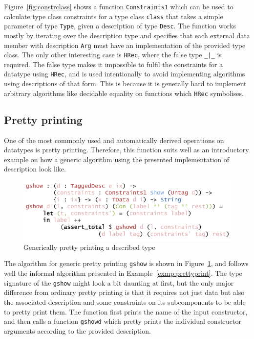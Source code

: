 \documentclass{ituthesis}
\newcommand{\ttconstructor}[1]{\textcolor{constructor-color}{\texttt{#1}}}
\newcommand{\tttype}[1]{\textcolor{type-color}{\texttt{#1}}}
\newcommand{\ttdec}[1]{\textcolor{declared-var-color}{\texttt{#1}}}
\newcommand{\ttvar}[1]{\textcolor{local-var-color}{\texttt{#1}}}
\theoremstyle{break}
\begin{document}
Figure~\ref{fig:constrclass} shows a function \ttdec{Constraints1} which can be used to calculate type class constraints
for a type class \ttvar{class} that takes a simple parameter of type \tttype{Type}, given a description of type \tttype{Desc}.
The function works mostly by iterating over the description type and specifies that each external data member with description \ttconstructor{Arg}
must have an implementation of the provided type class.
The only other interesting case is \ttconstructor{HRec}, where the false type \tttype{\_|\_} is required.
The false type makes it impossible to fulfil the constraints for a datatype using \ttconstructor{HRec}, and is used intentionally to avoid implementing algorithms using descriptions of that form.
This is because it is generally hard to implement arbitrary algorithms like decidable equality on functions which \ttconstructor{HRec} symbolises.

\subsection{Pretty printing}
\label{sub:Pretty printing}
One of the most commonly used and automatically derived operations on datatypes is pretty printing.
Therefore, this function suits well as an introductory example on how a generic algorithm using the presented implementation of description
look like.

\begin{figure}[ht]
\begin{center}
    \includegraphics[scale=0.5]{Figures/GenericShow.png}
\end{center}
\caption{Generically pretty printing a described type}
\label{fig:showgen}
\end{figure}

The algorithm for generic pretty printing \ttdec{gshow} is shown in Figure~\ref{fig:showgen}, and follows well the informal algorithm presented in Example~\ref{exmp:prettyprint}.
The type signature of the \ttdec{gshow} might look a bit daunting at first, but the only major difference from ordinary pretty printing is that it requires not just data but also the associated description
and some constraints on its subcomponents to be able to pretty print them.
The function first prints the name of the input constructor, and then calls a function \ttdec{gshowd} which pretty prints the individual constructor arguments according to the provided description.
\end{document}
